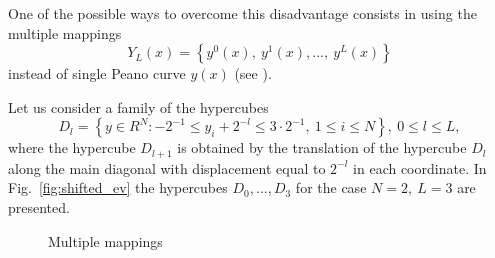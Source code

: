 \documentclass[runningheads]{llncs}
\begin{document}
One of the possible ways to overcome this disadvantage consists in using the multiple mappings
\begin{equation}%
Y_L(x)=\left\{y^0(x),\ y^1(x),...,\ y^L(x)\right\}
\end{equation}
instead of single Peano curve $y(x)$ (see \cite{Strongin1991,Strongin1992,strSergGO}).

Let us consider a family of the hypercubes
\begin{equation}\label{6_hypercubes}
D_l= \left\{y \in R^N: -2^{-1} \leq y_i+2^{-l} \leq 3 \cdot 2^{-1},\ 1\leq i\leq N\right\},\ 0 \leq l \leq L,
\end{equation}
where the hypercube $D_{l+1}$ is obtained by the translation of the hypercube $D_l$ along the main diagonal with displacement equal to $2^{-l}$ in each coordinate. In Fig.~\ref{fig:shifted_ev} the hypercubes $D_0,...,D_3$ for the case $N=2,\ L=3$ are presented.

\begin{figure}[ht]
    \centering
    \caption{Multiple mappings}
\end{figure}
\end{document}

